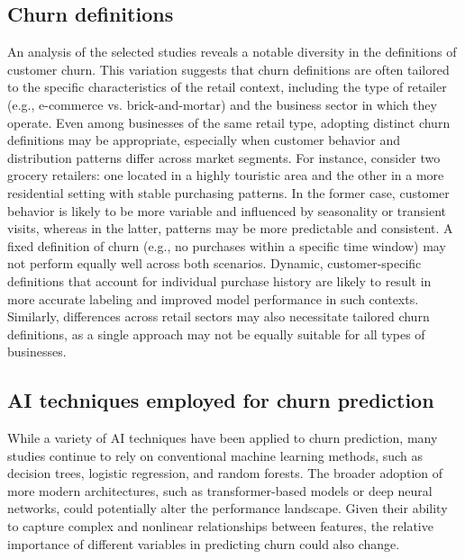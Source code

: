 \documentclass[preprint,12pt]{elsarticle}
\begin{document}
\subsection{Churn definitions}
\noindent An analysis of the selected studies reveals a notable diversity in the definitions of customer churn. This variation suggests that churn definitions are often tailored to the specific characteristics of the retail context, including the type of retailer (e.g., e-commerce vs. brick-and-mortar) and the business sector in which they operate. 
Even among businesses of the same retail type, adopting distinct churn definitions may be appropriate, especially when customer behavior and distribution patterns differ across market segments.
For instance, consider two grocery retailers: one located in a highly touristic area and the other in a more residential setting with stable purchasing patterns. In the former case, customer behavior is likely to be more variable and influenced by seasonality or transient visits, whereas in the latter, patterns may be more predictable and consistent. A fixed definition of churn (e.g., no purchases within a specific time window) may not perform equally well across both scenarios. 
Dynamic, customer-specific definitions that account for individual purchase history are likely to result in more accurate labeling and improved model performance in such contexts.
Similarly, differences across retail sectors may also necessitate tailored churn definitions, as a single approach may not be equally suitable for all types of businesses.

\subsection{AI techniques employed for churn prediction}
\noindent While a variety of AI techniques have been applied to churn prediction, many studies continue to rely on conventional machine learning methods, such as decision trees, logistic regression, and random forests. 
The broader adoption of more modern architectures, such as transformer-based models or deep neural networks, could potentially alter the performance landscape. Given their ability to capture complex and nonlinear relationships between features, the relative importance of different variables in predicting churn could also change.
\end{document}
